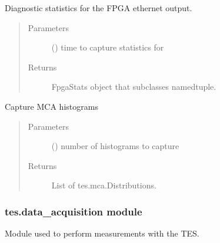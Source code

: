 \documentclass[letterpaper,10pt,english]{sphinxmanual}
\begin{document}

\begin{fulllineitems}
\label{\detokenize{tes:tes.data.fpga_stats}}
\sphinxAtStartPar
Diagnostic statistics for the FPGA ethernet output.
\begin{quote}\begin{description}
\item[{Parameters}] \leavevmode
\sphinxAtStartPar
{} () \textendash{} time to capture statistics for

\item[{Returns}] \leavevmode
\sphinxAtStartPar
FpgaStats object that subclasses namedtuple.

\end{description}\end{quote}

\end{fulllineitems}


\begin{fulllineitems}
\label{\detokenize{tes:tes.data.read_mca}}
\sphinxAtStartPar
Capture MCA histograms
\begin{quote}\begin{description}
\item[{Parameters}] \leavevmode
\sphinxAtStartPar
{} () \textendash{} number of histograms to capture

\item[{Returns}] \leavevmode
\sphinxAtStartPar
List of tes.mca.Distributions.

\end{description}\end{quote}

\end{fulllineitems}



\subsubsection{tes.data\_acquisition module}
\label{\detokenize{tes:module-tes.data_acquisition}}\label{\detokenize{tes:tes-data-acquisition-module}}
\sphinxAtStartPar
Module used to perform measurements with the TES.
\end{document}

